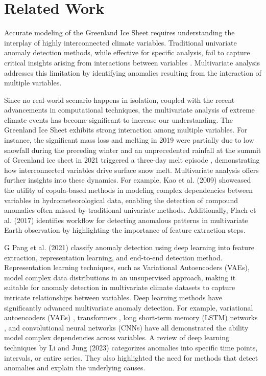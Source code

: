 \section{Related Work}
Accurate modeling of the Greenland Ice Sheet requires understanding the interplay of highly interconnected climate variables. Traditional univariate anomaly detection methods, while effective for specific analysis, fail to capture critical insights arising from interactions between variables \cite{flach2017multivariate}. Multivariate analysis addresses this limitation by identifying anomalies resulting from the interaction of multiple variables.

Since no real-world scenario happens in isolation, coupled with the recent advancements in computational techniques, the multivariate analysis of extreme climate events has become significant to increase our understanding. The Greenland Ice Sheet exhibits strong interaction among multiple variables. For instance, the significant mass loss and melting in 2019 were partially due to low snowfall during the preceding winter \cite{nsidc2019} and an unprecedented rainfall at the summit of Greenland ice sheet in 2021 triggered a three-day melt episode \cite{overland2022arctic}, demonstrating how interconnected variables drive surface snow melt. Multivariate analysis offers further insights into these dynamics. For example, Kao et al. (2009) \cite{kao2009motivating} showcased the utility of copula-based methods in modeling complex dependencies between variables in hydrometeorological data, enabling the detection of compound anomalies often missed by traditional univariate methods. Additionally, Flach et al. (2017) \cite{flach2017multivariate} identifies workflow for detecting anomalous patterns in multivariate Earth observation by highlighting the importance of feature extraction steps.  

G Pang et al. (2021) \cite{pang2021deep} classify anomaly detection using deep learning into feature extraction, representation learning, and end-to-end detection method. Representation learning techniques, such as Variational Autoencoders (VAEs), model complex data distributions in an unsupervised approach, making it suitable for anomaly detection in multivariate climate datasets to capture intricate relationships between variables.
Deep learning methods have significantly advanced multivariate anomaly detection. For example, variational autoencoders (VAEs) \cite{an2015variational, sinha2020variational}, transformers \cite{tuli2022tranad, wang2022variational}, long short-term memory (LSTM) networks \cite{lindemann2021survey, ergen2019unsupervised}, and convolutional neural networks (CNNs) \cite{thill2021temporal, he2019temporal} have all demonstrated the ability model complex dependencies across variables. A review of deep learning techniques by Li and Jung (2023) \cite{li2023deep} categorizes anomalies into specific time points, intervals, or entire series. They also highlighted the need for methods that detect anomalies and explain the underlying causes.

